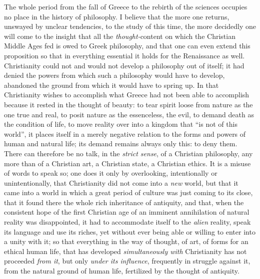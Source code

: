 \documentclass[12pt,a4paper,openany]{book}
\newcommand{\opage}[1]{\marginnote{\footnotesize\textit{[#1]}}}
\begin{document}
The whole period from the fall of Greece to the rebirth of the sciences
occupies no place in the history of philosophy. I believe that the more
one returns, unswayed by unclear tendencies, to the study of this time,
the more decidedly one will come to the insight that all the
\emph{thought-}content on which the Christian Middle Ages fed is owed
to Greek philosophy, and that one can even extend this proposition so
that in everything essential it holds for the Renaissance as well.
Christianity could not and would not develop a philosophy out of itself;
it had denied the powers from which such a philosophy would have to
develop, abandoned the ground from which it would have to spring up. In
that Christianity wishes to accomplish what Greece had not been able to
accomplish because it rested in the thought of beauty: to tear spirit
loose from nature as the one true and real, to posit nature as the
essenceless, the evil, to demand death as the condition of life, to move
reality over into a kingdom that ``is not of this world'', it places
itself in a merely negative relation
\opage{5}to the forms and powers of human and natural life; its demand
remains always only this: to deny them. There can therefore be no talk,
in the \emph{strict sense}, of a Christian philosophy, any more than of a
Christian art, a Christian state, a Christian ethics. It is a misuse of
words to speak so; one does it only by overlooking, intentionally or
unintentionally, that Christianity did not come into a \emph{new} world,
but that it came into a world in which a great period of culture was
just coming to its close, that it found there the whole rich inheritance
of antiquity, and that, when the consistent hope of the first Christian
age of an imminent annihilation of natural reality was disappointed, it
had to accommodate itself to the \emph{alien} reality, speak its language
and use its riches, yet without ever being able or willing to enter into
a unity with it; so that everything in the way of thought, of art, of
forms for an ethical human life, that has developed \emph{simultaneously
with} Christianity has not proceeded \emph{from it}, but only
\emph{under its influence}, frequently in struggle against it, from the
natural ground of human life, fertilized by the thought of antiquity.
\end{document}
